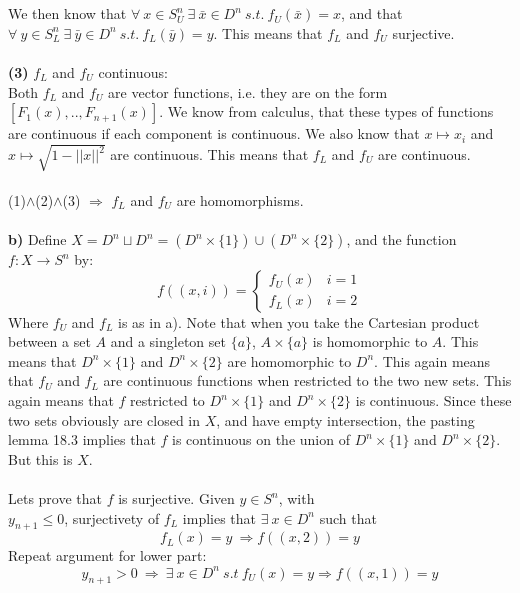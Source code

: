 \documentclass[11pt,a4paper]{report}
\begin{document}
\\
\\
We then know that $\forall \ x \in S_U^n \ \exists \ \bar{x} \in D^n \ s.t. \ f_U(\bar{x})=x$, and that  $\forall \ y \in S_L^n \ \exists \ \bar{y} \in D^n \ s.t. \ f_L(\bar{y})=y$. This means that  $f_L$ and $f_U$ surjective.
\\
\\
\textbf{(3)} $f_L$ and $f_U$ continuous:
\\
Both $f_L$ and $f_U$ are vector functions, i.e. they are on the form $[F_1(x),..,F_{n+1}(x)]$. We know from calculus, that these types of functions are continuous if each component is continuous. We also know that $x \mapsto x_i$ and $x \mapsto \sqrt{1-||x||^2}$ are continuous. This means that $f_L$ and $f_U$ are continuous.
\\
\\
(1)$\wedge$(2)$\wedge$(3) $\Rightarrow$ $f_L$ and $f_U$ are homomorphisms.
\\
\\
\textbf{b)} Define $X=D^n \sqcup D^n =(D^n \times \{1\}) \cup (D^n \times \{2 \})$, and the function $f:X \rightarrow S^n$ by: 
\begin{displaymath}
   f((x,i)) = \left\{
     \begin{array}{lr}
       f_U(x) &  i = 1 \\
       f_L(x) &  i = 2
     \end{array}
   \right.
\end{displaymath} 
Where $f_U$ and $f_L$ is as in a). Note that when you take the Cartesian product between a set $A$ and a singleton set $\{a\}$, $A \times \{a\}$ is homomorphic to $A$. This means that $D^n \times \{1\}$ and $D^n \times \{2\}$ are homomorphic to $D^n$. This again means that $f_U$ and $f_L$ are continuous functions when restricted to the two new sets. This again means that $f$ restricted to $D^n \times \{1\}$ and $D^n \times \{2\}$ is continuous. Since these two sets obviously are closed in $X$, and have empty intersection, the pasting lemma 18.3 implies that $f$ is continuous on the union of       $D^n \times \{1\}$ and $D^n \times \{2\}$. But this is $X$.
\\
\\
Lets prove that $f$ is surjective. Given $y \in  S^n$, with \\ $y_{n+1}\leq0$, surjectivety of $f_L$ implies that $\exists \ x \in D^n$ such that $$f_L(x)=y \ \Rightarrow f((x,2))=y$$ Repeat argument for lower part: $$y_{n+1}>0 \ \Rightarrow \ \exists \ x \in D^n \ s.t \ f_U(x)=y \Rightarrow f((x,1))=y$$
\end{document}
